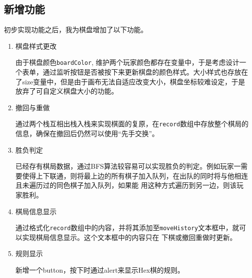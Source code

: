 \subsection{新增功能}
初步实现功能之后，我为棋盘增加了以下功能。
\begin{enumerate}
    \item 棋盘样式更改

    由于棋盘颜色\verb|boardColor|, 维护两个玩家颜色都存在变量中，于是考虑设计一个表单，通过监听按钮是否被按下来更新棋盘的颜色样式。大小样式也存放在了size变量中，但是由于画布无法自适应改变大小，棋盘坐标较难设定，于是放弃了可自定义棋盘大小的功能。

    \item 撤回与重做

    通过两个栈互相出栈入栈来实现棋面的复原，在\verb|record|数组中存放整个棋局的信息，确保在撤回后仍然可以使用``先手交换''。

    \item 胜负判定

    已经存有棋局数据，通过BFS算法较容易可以实现胜负的判定。例如玩家一需要使得上下联通，则将最上边的所有棋子加入队列，在出队的同时将与他相连且未遍历过的同色棋子加入队列，如果能
    用这种方式遍历到另一边，则该玩家胜利。

    \item 棋局信息显示

    通过格式化\verb|record|数组中的内容，并将其添加至\verb|moveHistory|文本框中，就可以实现棋局信息显示。这个文本框中的内容只在
    下棋或撤回重做时更新。

    \item 规则显示

    新增一个button，按下时通过alert来显示Hex棋的规则。
\end{enumerate}